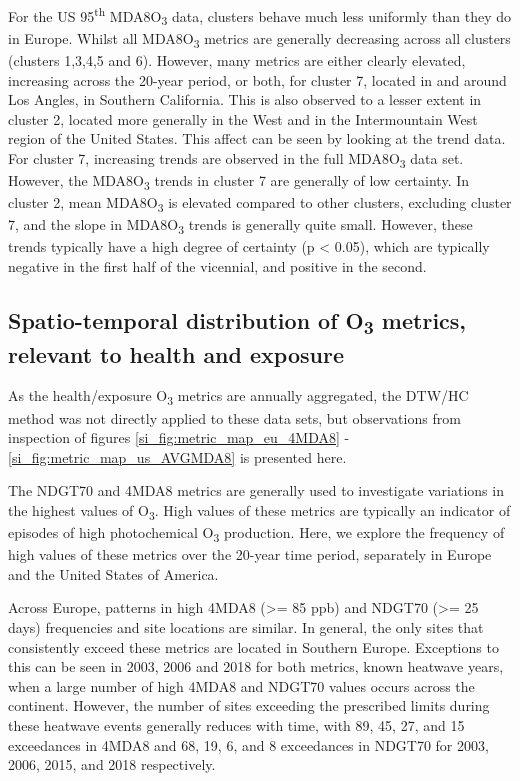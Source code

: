 \documentclass[journal abbreviation, manuscript]{copernicus}
\begin{document}
For the US 95\textsuperscript{th} MDA8O\textsubscript{3} data, clusters behave much less uniformly than they do in Europe. Whilst all MDA8O\textsubscript{3} metrics are generally decreasing across all clusters (clusters 1,3,4,5 and 6). However, many metrics are either clearly elevated, increasing across the 20-year period, or both, for cluster 7, located in and around Los Angles, in Southern California. This is also observed to a lesser extent in cluster 2, located more generally in the West and in the Intermountain West region of the United States. This affect can be seen by looking at the trend data. For cluster 7, increasing trends are observed in the full MDA8O\textsubscript{3} data set. However, the MDA8O\textsubscript{3} trends in cluster 7 are generally of low certainty. In cluster 2, mean MDA8O\textsubscript{3} is elevated compared to other clusters, excluding cluster 7, and the slope in MDA8O\textsubscript{3} trends is generally quite small. However, these trends typically have a high degree of certainty (p < 0.05), which are typically negative in the first half of the vicennial, and positive in the second. 

\subsection{Spatio-temporal distribution of O\textsubscript{3} metrics, relevant to health and exposure} \label{sect:metrics_distribution}

As the health/exposure O\textsubscript{3} metrics are annually aggregated, the DTW/HC method was not directly applied to these data sets, but observations from inspection of figures \ref{si_fig:metric_map_eu_4MDA8} - \ref{si_fig:metric_map_us_AVGMDA8} is presented here. 

The NDGT70 and 4MDA8 metrics are generally used to investigate variations in the highest values of O\textsubscript{3}. High values of these metrics are typically an indicator of episodes of high photochemical O\textsubscript{3} production. Here, we explore the frequency of high values of these metrics over the 20-year time period, separately in Europe and the United States of America.

Across Europe, patterns in high 4MDA8 (>= 85 ppb) and NDGT70 (>= 25 days) frequencies and site locations are similar. In general, the only sites that consistently exceed these metrics are located in Southern Europe. Exceptions to this can be seen in 2003, 2006 and 2018 for both metrics, known heatwave years, when a large number of high 4MDA8 and NDGT70 values occurs across the continent. However, the number of sites exceeding the prescribed limits during these heatwave events generally reduces with time, with 89, 45, 27, and 15 exceedances in 4MDA8 and 68, 19, 6, and 8 exceedances in NDGT70 for 2003, 2006, 2015, and 2018 respectively.
\end{document}
